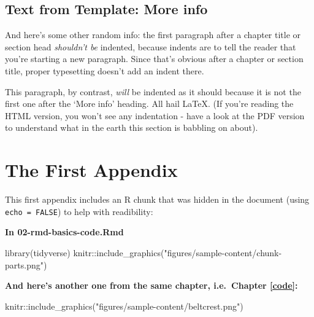 \documentclass[a4paper, nobind]{templates/ociamthesis}
\newenvironment{Shaded}{\begin{snugshade}}{\end{snugshade}}
\newcommand{\FunctionTok}[1]{\textcolor[rgb]{0.00,0.00,0.00}{#1}}
\newcommand{\NormalTok}[1]{#1}
\newcommand{\SpecialCharTok}[1]{\textcolor[rgb]{0.00,0.00,0.00}{#1}}
\newcommand{\StringTok}[1]{\textcolor[rgb]{0.31,0.60,0.02}{#1}}
\renewenvironment{Shaded}
{
  \vspace{10pt}%
  \begin{snugshade}%
}{%
  \end{snugshade}%
  \vspace{8pt}%
}
\begin{document}
\hypertarget{text-from-template-more-info}{%
\section*{Text from Template: More info}\label{text-from-template-more-info}}

And here's some other random info:
the first paragraph after a chapter title or section head \emph{shouldn't be} indented, because indents are to tell the reader that you're starting a new paragraph.
Since that's obvious after a chapter or section title, proper typesetting doesn't add an indent there.

This paragraph, by contrast, \emph{will} be indented as it should because it is not the first one after the `More info' heading.
All hail LaTeX. (If you're reading the HTML version, you won't see any indentation - have a look at the PDF version to understand what in the earth this section is babbling on about).

\startappendices

\hypertarget{the-first-appendix}{%
\chapter{The First Appendix}\label{the-first-appendix}}

This first appendix includes an R chunk that was hidden in the document (using \texttt{echo\ =\ FALSE}) to help with readibility:

\textbf{In 02-rmd-basics-code.Rmd}

\begin{Shaded}
\begin{Highlighting}[]
\FunctionTok{library}\NormalTok{(tidyverse)}
\NormalTok{knitr}\SpecialCharTok{::}\FunctionTok{include\_graphics}\NormalTok{(}\StringTok{"figures/sample{-}content/chunk{-}parts.png"}\NormalTok{)}
\end{Highlighting}
\end{Shaded}

\textbf{And here's another one from the same chapter, i.e.~Chapter \ref{code}:}

\begin{Shaded}
\begin{Highlighting}[]
\NormalTok{knitr}\SpecialCharTok{::}\FunctionTok{include\_graphics}\NormalTok{(}\StringTok{"figures/sample{-}content/beltcrest.png"}\NormalTok{)}
\end{Highlighting}
\end{Shaded}
\end{document}
